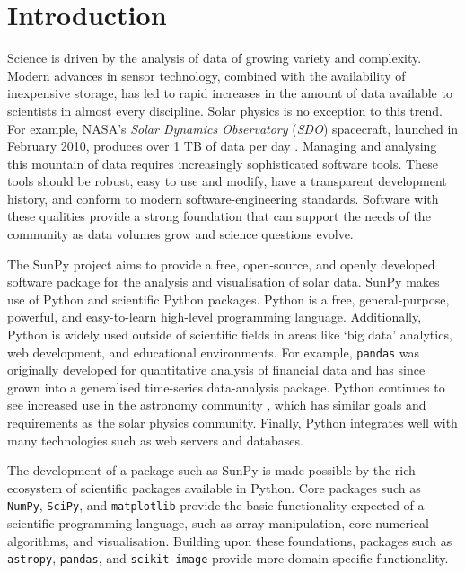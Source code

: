 \section{Introduction}\label{sec:Intro}

Science is driven by the analysis of data of growing variety and complexity.
Modern advances in sensor technology, combined with the availability of inexpensive 
storage, has led to rapid increases in the amount of data available to scientists in almost
every discipline.  Solar physics is no exception to this trend. For example,
NASA's \textit{Solar Dynamics Observatory} (\textit{SDO}) spacecraft, launched
in February 2010, produces over 1 TB of data per day \citep{aia}. Managing and
analysing this mountain of data requires increasingly sophisticated software
tools. These tools should be robust, easy to use and modify, have a transparent
development history, and conform to modern software-engineering
standards. Software with these qualities provide a strong foundation that can support the
needs of the community as data volumes grow and science questions evolve.

The SunPy project aims to provide a free, open-source, and openly developed
software package for the analysis and visualisation of solar data. SunPy makes
use of Python and scientific Python packages. Python is a free, general-purpose, 
powerful, and easy-to-learn high-level programming language. Additionally, Python is 
widely used outside of scientific fields in areas like `big data' analytics, web 
development, and educational environments. For example, \texttt{pandas} was 
originally developed for quantitative analysis of financial data and has since 
grown into a generalised time-series data-analysis package. Python continues to 
see increased use in the astronomy community \citep{greenfield2011}, which has 
similar goals and requirements as the solar physics community. Finally, Python 
integrates well with many technologies such as web servers \citep{dolgert2008} and databases. 

The development of a package such as SunPy is made possible by the rich ecosystem of 
scientific packages available in Python. Core packages such as \texttt{NumPy}, 
\texttt{SciPy}, and \texttt{matplotlib} provide the basic functionality expected of a 
scientific programming language,
such as array manipulation, core numerical algorithms, and visualisation.
Building upon these foundations, packages such as \texttt{astropy}, \texttt{pandas}, and
\texttt{scikit-image} provide more domain-specific functionality.

